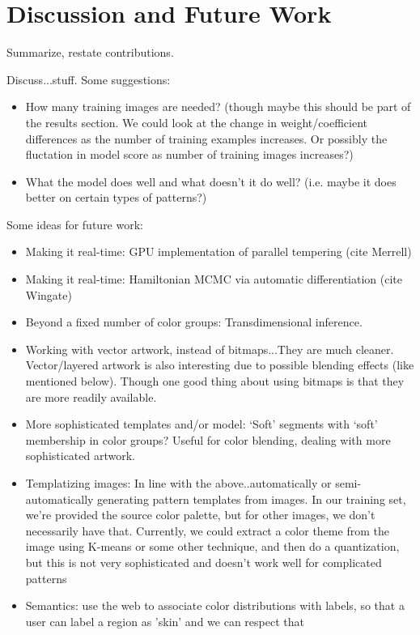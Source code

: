 \section{Discussion and Future Work}
\label{sec:discussion}

Summarize, restate contributions.

Discuss...stuff.
Some suggestions:
\begin{itemize}
\item{How many training images are needed? (though maybe this should be part of the results section. We could look at the change in weight/coefficient differences as the number of training examples increases. Or possibly the fluctation in model score as number of training images increases?)}
\item{What the model does well and what doesn't it do well? (i.e. maybe it does better on certain types of patterns?) }
\end{itemize}


Some ideas for future work:
\begin{itemize}
 \item{Making it real-time: GPU implementation of parallel tempering (cite Merrell)}
 \item{Making it real-time: Hamiltonian MCMC via automatic differentiation (cite Wingate)}
 \item{Beyond a fixed number of color groups: Transdimensional inference.}
  \item{Working with vector artwork, instead of bitmaps...They are much cleaner. Vector/layered artwork is also interesting due to possible blending effects (like mentioned below). Though one good thing about using bitmaps is that they are more readily available.}
 \item{More sophisticated templates and/or model: `Soft' segments with `soft' membership in color groups? Useful for color blending, dealing with more sophisticated artwork.}
 \item{Templatizing images: In line with the above..automatically or semi-automatically generating pattern templates from images. In our training set, we're provided the source color palette, but for other images, we don't necessarily have that. Currently, we could extract a color theme from the image using K-means or some other technique, and then do a quantization, but this is not very sophisticated and doesn't work well for complicated patterns}
 \item{Semantics: use the web to associate color distributions with labels, so that a user can label a region as 'skin' and we can respect that}
\end{itemize}